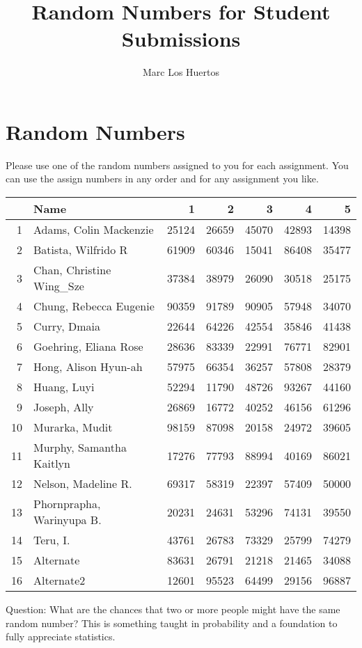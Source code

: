 \documentclass{article}\usepackage[]{graphicx}\usepackage[]{color}
\title{Random Numbers for Student Submissions}
\author{Marc Los Huertos}
\begin{document}
\maketitle


\section*{Random Numbers}

Please use one of the random numbers assigned to you for each assignment. You can use the assign numbers in any order and for any assignment you like. 

\begin{table}[ht]
\centering
\begin{tabular}{rlrrrrr}
  \hline
 & Name & 1 & 2 & 3 & 4 & 5 \\ 
  \hline
1 & Adams, Colin Mackenzie & 25124 & 26659 & 45070 & 42893 & 14398 \\ 
  2 & Batista, Wilfrido R & 61909 & 60346 & 15041 & 86408 & 35477 \\ 
  3 & Chan, Christine Wing\_Sze & 37384 & 38979 & 26090 & 30518 & 25175 \\ 
  4 & Chung, Rebecca Eugenie & 90359 & 91789 & 90905 & 57948 & 34070 \\ 
  5 & Curry, Dmaia & 22644 & 64226 & 42554 & 35846 & 41438 \\ 
  6 & Goehring, Eliana Rose & 28636 & 83339 & 22991 & 76771 & 82901 \\ 
  7 & Hong, Alison Hyun-ah & 57975 & 66354 & 36257 & 57808 & 28379 \\ 
  8 & Huang, Luyi & 52294 & 11790 & 48726 & 93267 & 44160 \\ 
  9 & Joseph, Ally & 26869 & 16772 & 40252 & 46156 & 61296 \\ 
  10 & Murarka, Mudit & 98159 & 87098 & 20158 & 24972 & 39605 \\ 
  11 & Murphy, Samantha Kaitlyn & 17276 & 77793 & 88994 & 40169 & 86021 \\ 
  12 & Nelson, Madeline R. & 69317 & 58319 & 22397 & 57409 & 50000 \\ 
  13 & Phornprapha, Warinyupa B. & 20231 & 24631 & 53296 & 74131 & 39550 \\ 
  14 & Teru, I. & 43761 & 26783 & 73329 & 25799 & 74279 \\ 
  15 & Alternate & 83631 & 26791 & 21218 & 21465 & 34088 \\ 
  16 & Alternate2 & 12601 & 95523 & 64499 & 29156 & 96887 \\ 
   \hline
\end{tabular}
\end{table}


Question: What are the chances that two or more people might have the same random number?  This is something taught in probability and a foundation to fully appreciate statistics.
\end{document}
